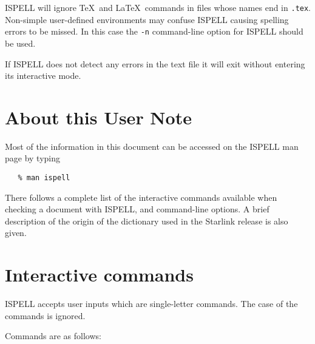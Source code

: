 ISPELL will ignore \TeX\ and \LaTeX\ commands in files whose names end in
\verb+.tex+\@.  Non-simple user-defined environments may confuse ISPELL
causing spelling errors to be missed.
In this case the \verb+-n+ command-line option for ISPELL should be used.

If ISPELL does not detect any errors in the text file it will exit without
entering its interactive mode.


\section{About this User Note}

Most of the information in this document can be accessed on the ISPELL man page
by typing

\begin{verbatim}
   % man ispell
\end{verbatim}

There follows a complete list of the interactive commands available when
checking a document with ISPELL, and command-line options. A brief description
of the origin of the dictionary used in the Starlink release is also given.


\section{Interactive commands}

ISPELL accepts user inputs which are single-letter commands.  The
case of the commands is ignored.

Commands are as follows:


